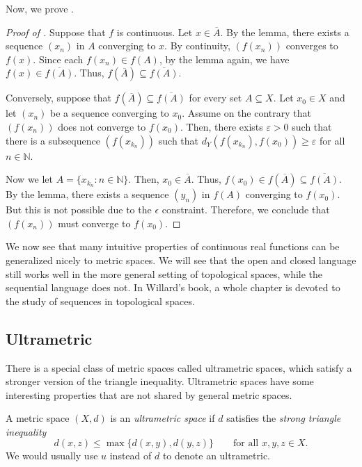 Now, we prove .
\begin{proof}[Proof of ]
  Suppose that $f$ is continuous. Let $x\in\overline{A}$. By the lemma, there exists a sequence $(x_n)$ in $A$ converging to $x$. By continuity, $(f(x_n))$ converges to $f(x)$. Since each $f(x_n)\in f(A)$, by the lemma again, we have $f(x)\in\overline{f(A)}$. Thus, $f(\overline{A})\subseteq\overline{f(A)}$.

  Conversely, suppose that $f(\overline{A})\subseteq\overline{f(A)}$ for every set $A\subseteq X$. Let $x_0\in X$ and let $(x_n)$ be a sequence converging to $x_0$. Assume on the contrary that $(f(x_n))$ does not converge to $f(x_0)$. Then, there exists $\varepsilon>0$ such that there is a subsequence $(f(x_{k_n}))$ such that $d_Y(f(x_{k_n}),f(x_0))\ge \varepsilon$ for all $n\in\mathbb{N}$.

  Now we let $A=\{x_{k_n}:n\in\mathbb{N}\}$. Then, $x_0\in\overline{A}$. Thus, $f(x_0)\in f(\overline{A})\subseteq \overline{f(A)}$. By the lemma, there exists a sequence $(y_n)$ in $f(A)$ converging to $f(x_0)$. But this is not possible due to the $\epsilon$ constraint. Therefore, we conclude that $(f(x_n))$ must converge to $f(x_0)$.
\end{proof}

We now see that many intuitive properties of continuous real functions can be generalized nicely to metric spaces. We will see that the open and closed language still works well in the more general setting of topological spaces, while the sequential language does not. In Willard's book, a whole chapter is devoted to the study of sequences in topological spaces.

\subsection{Ultrametric}
There is a special class of metric spaces called ultrametric spaces, which satisfy a stronger version of the triangle inequality. Ultrametric spaces have some interesting properties that are not shared by general metric spaces.

\begin{definition}
A metric space $(X,d)$ is an \emph{ultrametric space} if $d$ satisfies the
\emph{strong triangle inequality}
\[
d(x,z)\le \max\{d(x,y),d(y,z)\}\qquad \text{for all }x,y,z\in X.
\]
We would usually use $u$ instead of $d$ to denote an ultrametric.
\end{definition}

